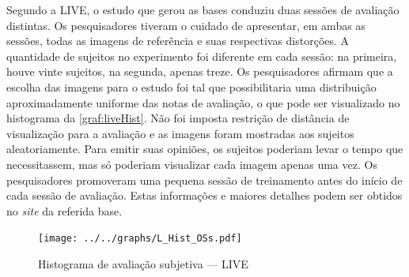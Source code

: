 Segundo a LIVE, o estudo que gerou as bases conduziu duas sessões de avaliação distintas. Os pesquisadores tiveram o cuidado de apresentar, em ambas as sessões, todas as imagens de referência e suas respectivas distorções. A quantidade de sujeitos no experimento foi diferente em cada sessão: na primeira, houve vinte sujeitos, na segunda, apenas treze. Os pesquisadores afirmam que a escolha das imagens para o estudo foi tal que possibilitaria uma distribuição aproximadamente uniforme das notas de avaliação, o que pode ser visualizado no histograma da \autoref{graf:liveHist}. Não foi imposta restrição de distância de visualização para a avaliação e as imagens foram mostradas aos sujeitos aleatoriamente. Para emitir suas opiniões, os sujeitos poderiam levar o tempo que necessitassem, mas só poderiam visualizar cada imagem apenas uma vez. Os pesquisadores promoveram uma pequena sessão de treinamento antes do início de cada sessão de avaliação. Estas informações e maiores detalhes podem ser obtidos no \emph{site} da referida base.

\begin{figure}[htb]
	\centering
	\begin{minipage}{.8\textwidth}
		\centering
		\caption{Histograma de avaliação subjetiva  --- LIVE}\label{graf:liveHist}
		\texttt{[image: ../../graphs/L\_Hist\_OSs.pdf]}
	\end{minipage}
\end{figure}

